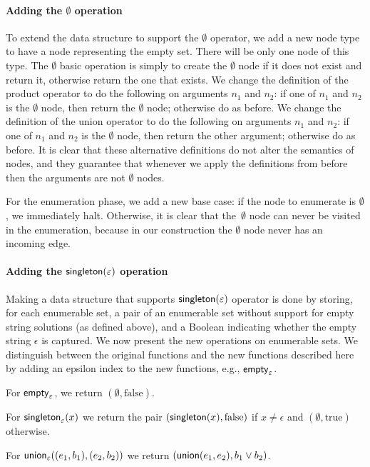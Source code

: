 \paragraph{Adding the $\emptyset$ operation}
To extend the data structure to support the $\emptyset$ operator, we add a new node type to have a node representing the empty
set. There will be only one node of this type.
%
The $\emptyset$ basic operation is simply to create the $\emptyset$ node if it
does not exist and return it, otherwise return the one that exists.
%
We change the definition of the product operator to do the following
on arguments $n_1$ and $n_2$: if one of $n_1$ and $n_2$ is the
$\emptyset$ node, then return the $\emptyset$ node; otherwise do as
before.
%
We change the definition of the union operator to do the following on arguments
$n_1$ and $n_2$: if one of $n_1$ and $n_2$ is the $\emptyset$ node, then return
the other argument; otherwise do as before.
%
It is clear that these alternative definitions do not alter the semantics of
nodes, and they guarantee that whenever we apply the definitions from before
then the arguments are not $\emptyset$ nodes.

For the enumeration phase, we add a new base case: if the node to enumerate is
$\emptyset$, we immediately halt. Otherwise, it is clear that the~$\emptyset$
node can never be visited in the enumeration, because in our construction the
$\emptyset$ node never has an incoming edge.


\paragraph{Adding the $\textsf{singleton}(\varepsilon)$ operation}
Making a data structure that supports $\textsf{singleton}(\varepsilon)$ operator
is done by storing, for each enumerable set, a pair of an enumerable set without support for empty string
solutions (as defined above), and a Boolean indicating whether the empty string
$\epsilon$ is captured. We now present the new operations on
enumerable sets. We distinguish between the original functions and the new
functions described here by adding an epsilon index to the new functions, e.g.,
$\mathsf{empty}_\varepsilon$.

For $\mathsf{empty}_\varepsilon$, we return $(\emptyset, \text{false})$.

For $\textsf{singleton}_\varepsilon(x)$ we return the pair
$(\textsf{singleton}(x),\text{false})$ if $x\neq \epsilon$ and
$(\emptyset,\text{true})$ otherwise. 

For $\mathsf{union}_\varepsilon( (e_1,b_1),
(e_2,b_2))$ we return $(\mathsf{union}(e_1,e_2),b_1\lor b_2)$. 

